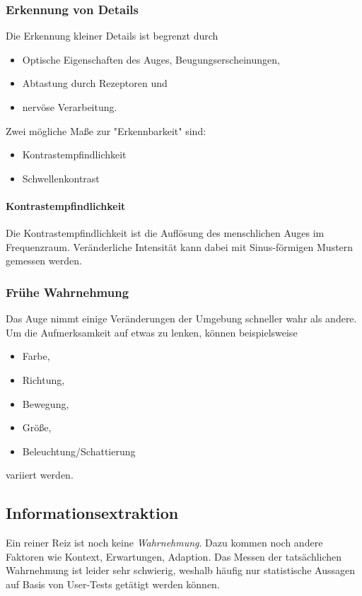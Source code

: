 
			\subsubsection{Erkennung von Details}
				Die Erkennung kleiner Details ist begrenzt durch
				\begin{itemize}
					\item Optische Eigenschaften des Auges, \zB Beugungserscheinungen,
					\item Abtastung durch Rezeptoren und
					\item nervöse Verarbeitung.
				\end{itemize}
				Zwei mögliche Maße zur "Erkennbarkeit" sind:
				\begin{itemize}
					\item Kontrastempfindlichkeit
					\item Schwellenkontrast
				\end{itemize}

				\paragraph{Kontrastempfindlichkeit}
					Die Kontrastempfindlichkeit ist die Auflösung des menschlichen Auges im Frequenzraum. Veränderliche Intensität kann dabei mit Sinus-förmigen Mustern gemessen werden.

			\subsubsection{Frühe Wahrnehmung}
				Das Auge nimmt einige Veränderungen der Umgebung schneller wahr als andere. Um die Aufmerksamkeit auf etwas zu lenken, können beispielsweise
				\begin{itemize}
					\item Farbe,
					\item Richtung,
					\item Bewegung,
					\item Größe,
					\item Beleuchtung/Schattierung
				\end{itemize}
				variiert werden.

		\subsection{Informationsextraktion}
			Ein reiner Reiz ist noch keine \emph{Wahrnehmung}. Dazu kommen noch andere Faktoren wie Kontext, Erwartungen, Adaption. Das Messen der tatsächlichen Wahrnehmung ist leider sehr schwierig, weshalb häufig nur statistische Aussagen auf Basis von User-Tests getätigt werden können.
			
